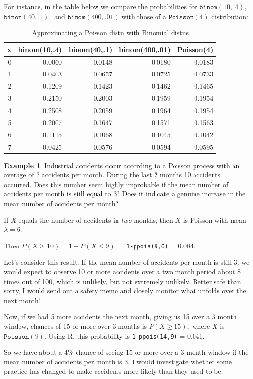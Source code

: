 \documentclass[
]{book}
\theoremstyle{definition}
\theoremstyle{definition}
\newtheorem{example}{Example}[chapter]
\theoremstyle{definition}
\theoremstyle{definition}
\theoremstyle{remark}
\begin{document}
For instance, in the table below we compare the probabilities for \(\texttt{binom}(10,.4),\) \(\texttt{binom}(40,.1),\) and \(\texttt{binom}(400,.01)\) with those of a \(\texttt{Poisson}(4)\) distribution:

\begin{table}
\centering
\caption{\label{tab:plot-pois-binom}Approximating a Poisson distn with Binomial distns}
\centering
\begin{tabular}[t]{r|r|r|r|r}
\hline
x & binom(10,.4) & binom(40,.1) & binom(400,.01) & Poisson(4)\\
\hline
0 & 0.0060 & 0.0148 & 0.0180 & 0.0183\\
\hline
1 & 0.0403 & 0.0657 & 0.0725 & 0.0733\\
\hline
2 & 0.1209 & 0.1423 & 0.1462 & 0.1465\\
\hline
3 & 0.2150 & 0.2003 & 0.1959 & 0.1954\\
\hline
4 & 0.2508 & 0.2059 & 0.1964 & 0.1954\\
\hline
5 & 0.2007 & 0.1647 & 0.1571 & 0.1563\\
\hline
6 & 0.1115 & 0.1068 & 0.1045 & 0.1042\\
\hline
7 & 0.0425 & 0.0576 & 0.0594 & 0.0595\\
\hline
\end{tabular}
\end{table}

\begin{example}
\protect\hypertarget{exm:pois-process}{}\label{exm:pois-process}Industrial accidents occur according to a Poisson process with an average of 3 accidents per month. During the last 2 months 10 accidents occurred. Does this number seem highly improbable if the mean number of accidents per month is still equal to 3? Does it indicate a genuine increase in the mean number of accidents per month?

If \(X\) equals the number of accidents in \emph{two} months, then \(X\) is Poisson with mean \(\lambda = 6\).

Then \(P(X \geq 10) = 1 - P(X \leq 9) =\) \texttt{1-ppois(9,6)} = 0.084.

Let's consider this result. If the mean number of accidents per month is still 3, we would expect to observe 10 or more accidents over a two month period about 8 times out of 100, which is unlikely, but not extremely unlikely. Better safe than sorry, I would send out a safety memo and closely monitor what unfolds over the next month!

Now, if we had 5 more accidents the next month, giving us 15 over a 3 month window, chances of 15 or more over 3 months is \(P(X \geq 15),\) where \(X\) is \(\texttt{Poisson}(9)\). Using R, this probability is \texttt{1-ppois(14,9)} = 0.041.

So we have about a 4\% chance of seeing 15 or more over a 3 month window if the mean number of accidents per month is 3. I would investigate whether some practice has changed to make accidents more likely than they used to be.
\end{example}
\end{document}
